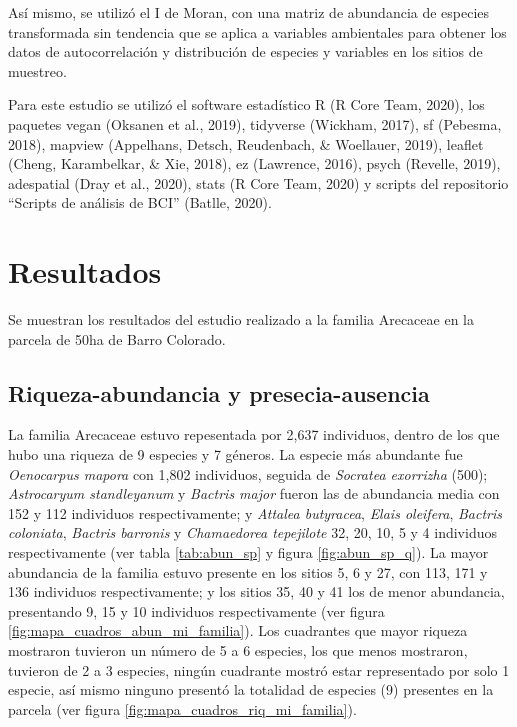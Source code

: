 \documentclass[11pt,]{article}
\begin{document}
Así mismo, se utilizó el I de Moran, con una matriz de abundancia de
especies transformada sin tendencia que se aplica a variables
ambientales para obtener los datos de autocorrelación y distribución de
especies y variables en los sitios de muestreo.

Para este estudio se utilizó el software estadístico R (R Core Team,
2020), los paquetes vegan (Oksanen et al., 2019), tidyverse (Wickham,
2017), sf (Pebesma, 2018), mapview (Appelhans, Detsch, Reudenbach, \&
Woellauer, 2019), leaflet (Cheng, Karambelkar, \& Xie, 2018), ez
(Lawrence, 2016), psych (Revelle, 2019), adespatial (Dray et al., 2020),
stats (R Core Team, 2020) y scripts del repositorio ``Scripts de
análisis de BCI'' (Batlle, 2020).

\section{Resultados}\label{resultados}

Se muestran los resultados del estudio realizado a la familia Arecaceae
en la parcela de 50ha de Barro Colorado.

\subsection{Riqueza-abundancia y
presecia-ausencia}\label{riqueza-abundancia-y-presecia-ausencia}

La familia Arecaceae estuvo repesentada por 2,637 individuos, dentro de
los que hubo una riqueza de 9 especies y 7 géneros. La especie más
abundante fue \emph{Oenocarpus mapora} con 1,802 individuos, seguida de
\emph{Socratea exorrizha} (500); \emph{Astrocaryum standleyanum} y
\emph{Bactris major} fueron las de abundancia media con 152 y 112
individuos respectivamente; y \emph{Attalea butyracea}, \emph{Elais
oleifera}, \emph{Bactris coloniata}, \emph{Bactris barronis} y
\emph{Chamaedorea tepejilote} 32, 20, 10, 5 y 4 individuos
respectivamente (ver tabla \ref{tab:abun_sp} y figura
\ref{fig:abun_sp_q}). La mayor abundancia de la familia estuvo presente
en los sitios 5, 6 y 27, con 113, 171 y 136 individuos respectivamente;
y los sitios 35, 40 y 41 los de menor abundancia, presentando 9, 15 y 10
individuos respectivamente (ver figura
\ref{fig:mapa_cuadros_abun_mi_familia}). Los cuadrantes que mayor
riqueza mostraron tuvieron un número de 5 a 6 especies, los que menos
mostraron, tuvieron de 2 a 3 especies, ningún cuadrante mostró estar
representado por solo 1 especie, así mismo ninguno presentó la totalidad
de especies (9) presentes en la parcela (ver figura
\ref{fig:mapa_cuadros_riq_mi_familia}).
\end{document}
